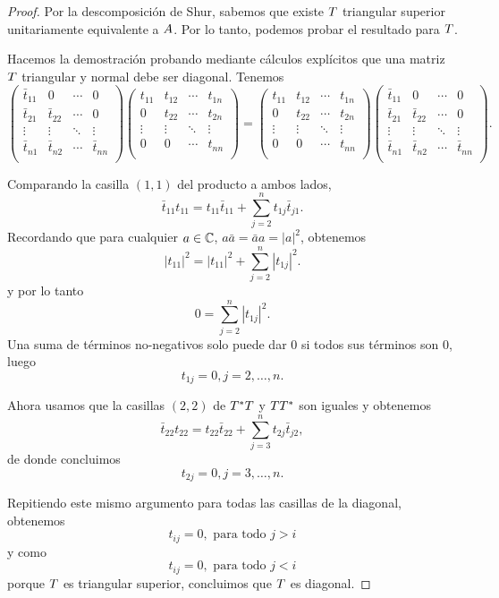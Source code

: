 \begin{proof}
Por la descomposición de Shur, sabemos que existe $\Tb$ triangular superior unitariamente equivalente a $\Ab$.
Por lo tanto, podemos probar el resultado para $\Tb$.

Hacemos la demostración probando mediante cálculos explícitos que una matriz $\Tb$ triangular y normal debe ser diagonal. Tenemos
$$
\begin{pmatrix}
\bar t_{11} & 0           & \cdots & 0 \\
\bar t_{21} & \bar t_{22} & \cdots & 0\\
\vdots      & \vdots      & \ddots & \vdots \\
\bar t_{n1} & \bar t_{n2} & \cdots & \bar t_{nn}\\
\end{pmatrix}
\begin{pmatrix}
t_{11} & t_{12} & \cdots & t_{1n} \\
0      & t_{22} & \cdots & t_{2n} \\
\vdots & \vdots & \ddots & \vdots \\
0      & 0      & \cdots & t_{nn}\\
\end{pmatrix} =
\begin{pmatrix}
t_{11} & t_{12} & \cdots & t_{1n} \\
0      & t_{22} & \cdots & t_{2n} \\
\vdots & \vdots & \ddots & \vdots \\
0      & 0      & \cdots & t_{nn}\\
\end{pmatrix} \begin{pmatrix}
\bar t_{11} & 0           & \cdots & 0 \\
\bar t_{21} & \bar t_{22} & \cdots & 0\\
\vdots      & \vdots      & \ddots & \vdots \\
\bar t_{n1} & \bar t_{n2} & \cdots & \bar t_{nn}\\
\end{pmatrix}.
$$

Comparando la casilla $(1,1)$ del producto a ambos lados,
$$
\bar t_{11} t_{11} = t_{11} \bar t_{11} + \sum_{j = 2}^n t_{1j} \bar t_{j1}.
$$
Recordando que para cualquier $a \in \mathbb C$, $a \bar a = \bar a a = |a|^2$, obtenemos
$$
|t_{11}|^2 = |t_{11}|^2  + \sum_{j = 2}^n |t_{1j}|^2.
$$
y por lo tanto
$$
0 = \sum_{j = 2}^n |t_{1j}|^2.
$$
Una suma de términos no-negativos solo puede dar 0 si todos sus términos son 0, luego
$$
t_{1j} = 0, j = 2, \dots, n.
$$

Ahora usamos que la casillas $(2,2)$ de $\Tb^* \Tb$ y $\Tb \Tb^*$ son iguales y obtenemos
$$
\bar t_{22} t_{22} = t_{22} \bar t_{22} + \sum_{j = 3}^n t_{2j} \bar t_{j2},
$$
de donde concluimos
$$
t_{2j} = 0, j = 3, \dots, n.
$$

Repitiendo este mismo argumento para todas las casillas de la diagonal, obtenemos
$$
t_{ij} = 0, \text{ para todo } j > i
$$
y como
$$
t_{ij} = 0, \text{ para todo } j < i
$$
porque $\Tb$ es triangular superior, concluimos que $\Tb$ es diagonal.
\end{proof}





